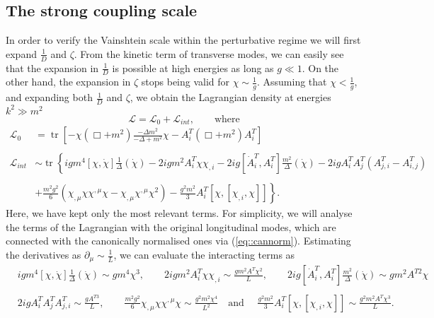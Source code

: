 \documentclass{article}
\DeclareMathOperator{\tr}{tr}
\begin{document}
\subsection{The strong coupling scale}
In order to verify the Vainshtein scale within the perturbative regime we will first expand $\frac{1}{D}$ and $\zeta$. From the kinetic term of transverse modes, we can easily see that the expansion in $\frac{1}{D}$ is possible at high energies as long as $g\ll 1$. On the other hand, the expansion in $\zeta$ stops being valid for $\chi\sim\frac{1}{g}$. Assuming that $\chi<\frac{1}{g}$, and expanding both $\frac{1}{D}$ and $\zeta$, we obtain the Lagrangian density at energies $k^2\gg m^2$
\begin{equation}\label{eq::Ldenspert}
    \mathcal{L}=\mathcal{L}_{0}+\mathcal{L}_{int}, \qquad\text{where}
\end{equation}
\begin{equation*}
    \begin{split}
        \mathcal{L}_0&=\tr\left[-\chi\left(\Box+m^2\right)\frac{-\Delta m^2}{-\Delta+m^2}\chi-A_i^T\left(\Box+m^2\right)A_i^T\right]\\\\
        \mathcal{L}_{int}&\sim\tr\left\{igm^4[\chi,\dot{\chi}]\frac{1}{\Delta}(\dot{\chi})-2igm^2A_i^T\chi\chi_{,i}-2ig\left[\dot{A}_i^T,A_i^T\right]\frac{m^2}{\Delta}\left(\dot{\chi}\right)-2igA_i^TA_j^T(A_{j,i}^T-A_{i,j}^T)\right.\\\\
        &\left.+\frac{m^2g^2}{6}\left(\chi_{,\mu}\chi\chi^{,\mu}\chi-\chi_{,\mu}\chi^{,\mu}\chi^2\right)-\frac{g^2m^2}{3}A_i^T\left[\chi,\left[\chi_{,i},\chi\right]\right]\right\}.
    \end{split}
\end{equation*}
Here, we have kept only the most relevant terms. For simplicity, we will analyse the terms of the Lagrangian with the original longitudinal modes, which are connected with the canonically normalised ones via (\ref{eq::cannorm}). Estimating the derivatives as $\partial_{\mu}\sim\frac{1}{L}$, we can evaluate the interacting terms as
\begin{equation}
    \begin{split}
        &igm^4[\chi,\dot{\chi}]\frac{1}{\Delta}(\dot{\chi})\sim gm^4\chi^3,\qquad 2igm^2A_i^T\chi\chi_{,i}\sim\frac{gm^2A^T\chi^2}{L},\qquad2ig\left[\dot{A}_i^T,A_i^T\right]\frac{m^2}{\Delta}\left(\dot{\chi}\right)\sim gm^2A^{T2}\chi \\\\
        &2igA_i^TA_j^TA_{j,i}^T\sim\frac{gA^{T3}}{L},\qquad \frac{m^2g^2}{6}\chi_{,\mu}\chi\chi^{,\mu}\chi\sim\frac{g^2m^2\chi^4}{L^2}\quad\text{and }\quad\frac{g^2m^2}{3}A_i^T\left[\chi,\left[\chi_{,i},\chi\right]\right]\sim\frac{g^2m^2A^T\chi^3}{L}.
    \end{split}
\end{equation}
\end{document}
